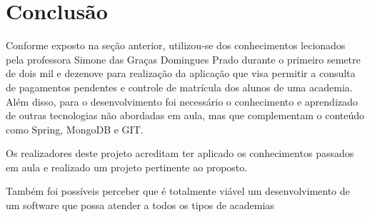 \chapter{Conclusão}\label{cap_conclu}

Conforme exposto na seção anterior, utilizou-se dos conhecimentos lecionados pela professora Simone das Graças Domingues Prado durante o primeiro semetre de dois mil e dezenove para realização da aplicação que visa permitir a consulta de pagamentos pendentes e controle de matrícula dos alunos de uma academia. Além disso, para o desenvolvimento foi necessário o conhecimento e aprendizado de outras tecnologias não abordadas em aula, mas que complementam o conteúdo como Spring, MongoDB e GIT.

Os realizadores deste projeto acreditam ter aplicado os conhecimentos passados em aula e realizado um projeto pertinente ao proposto.

Também foi possíveis perceber que é totalmente viável um desenvolvimento de um software que possa atender a todos os tipos de academias 